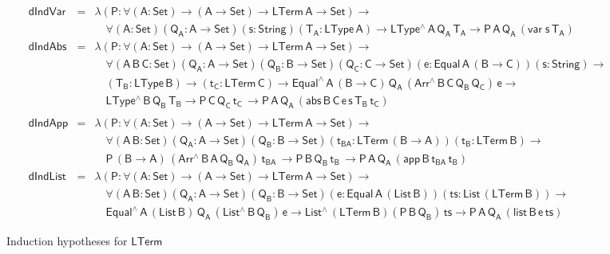 \documentclass[sigplan,screen]{acmart}
\begin{document}
\begin{figure*}[t]
\begin{adjustbox}{varwidth=7.3in, max width=7.1in, margin=-0.0in 0in
      -0.2in 0in, center}
{\small
\[\begin{array}{lll}
\mathsf{dIndVar} & = & \mathsf{\lambda (P : \forall (A : Set) \to (A \to Set) \to
  LTerm\,A  \to Set) \to}\\
& &   \quad\mathsf{\forall (A : Set) (Q_A : A \to Set) (s : String) (T_A :
  LType\, A) \to LType^{\wedge} \, A\, Q_A\, T_A \to P \, A\, Q_A\,
 (var \; s\, T_A)}\\[1ex]
\mathsf{dIndAbs} & = & \mathsf{\lambda (P : \forall (A : Set) \to (A \to Set) \to
  LTerm\,A \to Set) \to} \\ 
& &   \quad\mathsf{
  \forall (A\,B\,C: Set) (Q_A : A \to Set)  (Q_B : B \to Set) (Q_C : C
  \to Set) (e : Equal\, A\, (B \to C)) (s : String) \to } \\ 
& &   \quad\mathsf{(T_B : LType\, B) \to (t_C : LTerm\, C)
  \to Equal^{\wedge}\,A\,(B \to C)\, Q_A \, (Arr^{\wedge} \, B\, C\,
  Q_B \, Q_C) \, e \to  } \\
& &   \quad\mathsf{
  LType^{\wedge}\, B\, Q_B\, T_B
  \to P\, C\, Q_C\, t_C\, 
  \to P \, A\, Q_A\, (abs \,B \,C \, e \,s \,T_B \, t_C)}\\
 \\
\mathsf{dIndApp} & = &  \mathsf{\lambda (P : \forall (A : Set) \to (A \to Set) \to LTerm\,A
    \to Set)\to} \\ 
& &  \quad \mathsf{
  \forall (A \,B : Set) (Q_A : A \to Set)  (Q_B : B \to Set) 
   (t_{BA} : LTerm\, (B \to A)) (t_B : LTerm\, B) \to} \\
& &   \quad \mathsf{
  P\, (B \to A)\, (Arr^{\wedge} \, B\, A\, Q_B \, Q_A) \, t_{BA} \, 
  \to P\, B\, Q_B\, t_B\, 
  \to P \, A\, Q_A\, (app \,B \,t_{BA} \, t_B) }\\[1ex]
\mathsf{dIndList} & = &   \mathsf{\lambda (P : \forall (A : Set) \to (A \to Set) \to LTerm\,A
    \to Set) \to} \\ 
& &   \quad \mathsf{
  \forall (A \,B : Set) (Q_A : A \to Set)  (Q_B : B \to Set) 
    (e : Equal\, A\, (List\, B)) (ts : List\, (LTerm\, B)) \to} \\ 
& &   \quad \mathsf{
    Equal^{\wedge}\, A\, (List\,B)\, Q_A\, (List^{\wedge}\, B\, Q_B)\, e 
  \to List^{\wedge}\, (LTerm\,B) (P\, B\, Q_B)\, ts
  \to P \, A\, Q_A\, (list \,B \,e \, ts) }
\end{array}\]}

\vspace*{-0.1in}

\caption{Induction hypotheses for $\mathsf{LTerm}$}\label{fig:ind-hyps-lterm}
\end{adjustbox}
\end{figure*}
\end{document}
